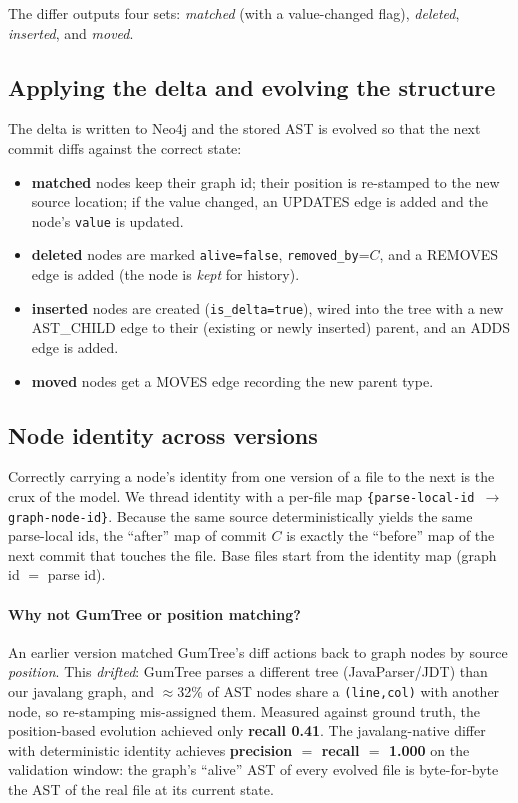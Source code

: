 \documentclass[11pt,a4paper]{article}
\newcommand{\code}[1]{\texttt{#1}}
\newcommand{\edge}[1]{\textsc{#1}}
\begin{document}
The differ outputs four sets: \emph{matched} (with a value-changed flag),
\emph{deleted}, \emph{inserted}, and \emph{moved}.

\subsection{Applying the delta and evolving the structure}
The delta is written to Neo4j and the stored AST is evolved so that the next
commit diffs against the correct state:

\begin{itemize}[nosep]
  \item \textbf{matched} nodes keep their graph id; their position is re-stamped
        to the new source location; if the value changed, an \edge{UPDATES} edge
        is added and the node's \code{value} is updated.
  \item \textbf{deleted} nodes are marked \code{alive=false}, \code{removed\_by}=$C$,
        and a \edge{REMOVES} edge is added (the node is \emph{kept} for history).
  \item \textbf{inserted} nodes are created (\code{is\_delta=true}), wired into
        the tree with a new \edge{AST\_CHILD} edge to their (existing or newly
        inserted) parent, and an \edge{ADDS} edge is added.
  \item \textbf{moved} nodes get a \edge{MOVES} edge recording the new parent type.
\end{itemize}

\subsection{Node identity across versions}\label{sec:identity}
Correctly carrying a node's identity from one version of a file to the next is
the crux of the model. We thread identity with a per-file map
\texttt{\{parse-local-id $\rightarrow$ graph-node-id\}}. Because the same source
deterministically yields the same parse-local ids, the ``after'' map of commit
$C$ is exactly the ``before'' map of the next commit that touches the file. Base
files start from the identity map (graph id $=$ parse id).

\paragraph{Why not GumTree or position matching?} An earlier version matched
GumTree's diff actions back to graph nodes by source \emph{position}. This
\emph{drifted}: GumTree parses a different tree (JavaParser/JDT) than our
javalang graph, and $\approx$32\% of AST nodes share a \texttt{(line,col)} with
another node, so re-stamping mis-assigned them. Measured against ground truth,
the position-based evolution achieved only \textbf{recall 0.41}. The
javalang-native differ with deterministic identity achieves
\textbf{precision $=$ recall $=$ 1.000} on the validation window: the graph's
``alive'' AST of every evolved file is byte-for-byte the AST of the real file at
its current state.
\end{document}

